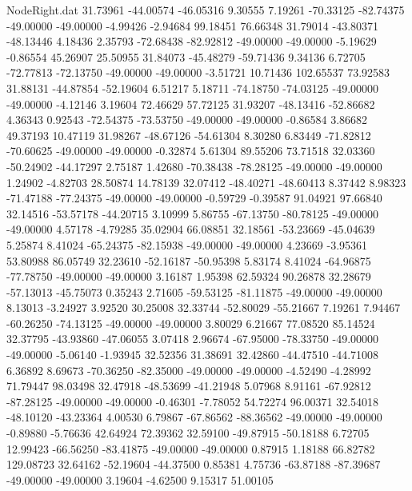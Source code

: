 \begin{filecontents}{NodeRight.dat}
  31.73961  -44.00574  -46.05316     9.30555    7.19261  -70.33125  -82.74375  -49.00000  -49.00000   -4.99426   -2.94684   99.18451   76.66348
  31.79014  -43.80371  -48.13446     4.18436    2.35793  -72.68438  -82.92812  -49.00000  -49.00000   -5.19629   -0.86554   45.26907   25.50955
  31.84073  -45.48279  -59.71436     9.34136    6.72705  -72.77813  -72.13750  -49.00000  -49.00000   -3.51721   10.71436  102.65537   73.92583
  31.88131  -44.87854  -52.19604     6.51217    5.18711  -74.18750  -74.03125  -49.00000  -49.00000   -4.12146    3.19604   72.46629   57.72125
  31.93207  -48.13416  -52.86682     4.36343    0.92543  -72.54375  -73.53750  -49.00000  -49.00000   -0.86584    3.86682   49.37193   10.47119
  31.98267  -48.67126  -54.61304     8.30280    6.83449  -71.82812  -70.60625  -49.00000  -49.00000   -0.32874    5.61304   89.55206   73.71518
  32.03360  -50.24902  -44.17297     2.75187    1.42680  -70.38438  -78.28125  -49.00000  -49.00000    1.24902   -4.82703   28.50874   14.78139
  32.07412  -48.40271  -48.60413     8.37442    8.98323  -71.47188  -77.24375  -49.00000  -49.00000   -0.59729   -0.39587   91.04921   97.66840
  32.14516  -53.57178  -44.20715     3.10999    5.86755  -67.13750  -80.78125  -49.00000  -49.00000    4.57178   -4.79285   35.02904   66.08851
  32.18561  -53.23669  -45.04639     5.25874    8.41024  -65.24375  -82.15938  -49.00000  -49.00000    4.23669   -3.95361   53.80988   86.05749
  32.23610  -52.16187  -50.95398     5.83174    8.41024  -64.96875  -77.78750  -49.00000  -49.00000    3.16187    1.95398   62.59324   90.26878
  32.28679  -57.13013  -45.75073     0.35243    2.71605  -59.53125  -81.11875  -49.00000  -49.00000    8.13013   -3.24927    3.92520   30.25008
  32.33744  -52.80029  -55.21667     7.19261    7.94467  -60.26250  -74.13125  -49.00000  -49.00000    3.80029    6.21667   77.08520   85.14524
  32.37795  -43.93860  -47.06055     3.07418    2.96674  -67.95000  -78.33750  -49.00000  -49.00000   -5.06140   -1.93945   32.52356   31.38691
  32.42860  -44.47510  -44.71008     6.36892    8.69673  -70.36250  -82.35000  -49.00000  -49.00000   -4.52490   -4.28992   71.79447   98.03498
  32.47918  -48.53699  -41.21948     5.07968    8.91161  -67.92812  -87.28125  -49.00000  -49.00000   -0.46301   -7.78052   54.72274   96.00371
  32.54018  -48.10120  -43.23364     4.00530    6.79867  -67.86562  -88.36562  -49.00000  -49.00000   -0.89880   -5.76636   42.64924   72.39362
  32.59100  -49.87915  -50.18188     6.72705   12.99423  -66.56250  -83.41875  -49.00000  -49.00000    0.87915    1.18188   66.82782  129.08723
  32.64162  -52.19604  -44.37500     0.85381    4.75736  -63.87188  -87.39687  -49.00000  -49.00000    3.19604   -4.62500    9.15317   51.00105

\end{filecontents}
